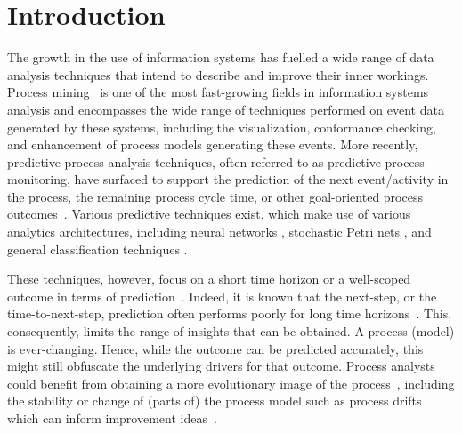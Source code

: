 \section{Introduction}\label{sec:introduction}

The growth in the use of information systems has fuelled a wide range of data analysis techniques that intend to describe and improve their inner workings.
Process mining~\cite{van2016data} is one of the most fast-growing fields in information systems analysis and encompasses the wide range of techniques performed on event data generated by these systems, including the visualization, conformance checking, and enhancement of process models generating these events.
More recently, predictive process analysis techniques, often referred to as predictive process monitoring, have surfaced to support the prediction of the next event/activity in the process, the remaining process cycle time, or other goal-oriented process outcomes~\cite{DBLP:conf/bpm/Francescomarino18}.
Various predictive techniques exist, which make use of various analytics architectures, including neural networks \cite{DBLP:conf/caise/TaxVRD17}, stochastic Petri nets \cite{DBLP:conf/icsoc/Rogge-SoltiW13}, and general classification techniques \cite{DBLP:journals/tkdd/TeinemaaDRM19}.

These techniques, however, focus on a short time horizon or a well-scoped outcome in terms of prediction~\cite{DBLP:journals/tkdd/TeinemaaDRM19}.
Indeed, it is known that the next-step, or the time-to-next-step, prediction often performs poorly for long time horizons~\cite{park2020predicting}.
This, consequently, limits the range of insights that can be obtained. 
A process (model) is ever-changing. Hence, while the outcome can be predicted accurately, this might still obfuscate the underlying drivers for that outcome.
Process analysts could benefit from obtaining a more evolutionary image of the process~\cite{DBLP:conf/bpm/PollPRRR18}, including the stability or change of (parts of) the process model such as process drifts which can inform improvement ideas~\cite{van2015pm}. 


